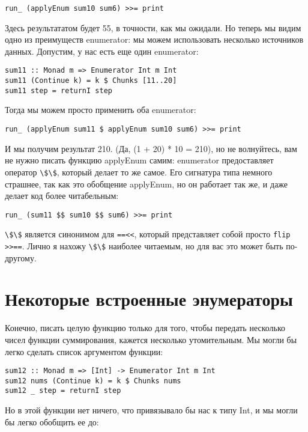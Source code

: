 \begin{lstlisting}
run_ (applyEnum sum10 sum6) >>= print
\end{lstlisting}

Здесь результататом будет 55, в точности, как мы ожидали. Но теперь мы видим одно из преимуществ enumerator: мы можем использовать несколько источников данных. Допустим, у нас есть еще один enumerator:

\begin{lstlisting}
sum11 :: Monad m => Enumerator Int m Int
sum11 (Continue k) = k $ Chunks [11..20]
sum11 step = returnI step
\end{lstlisting}%

Тогда мы можем просто применить оба enumerator:

\begin{lstlisting}
run_ (applyEnum sum11 $ applyEnum sum10 sum6) >>= print
\end{lstlisting}%

И мы получим результат 210. (Да, (1 + 20) * 10 = 210), но не волнуйтесь, вам не нужно писать функцию applyEnum самим: enumerator предоставляет оператор \lstinline'\$\$', который делает то же самое. Его сигнатура типа немного страшнее, так как это обобщение applyEnum, но он работает так же, и даже делает код более читабельным:

\begin{lstlisting}
run_ (sum11 $$ sum10 $$ sum6) >>= print
\end{lstlisting}%

\lstinline'\$\$' является синонимом для \lstinline'==<<', который представляет собой просто \lstinline'flip >>=='. Лично я нахожу \lstinline'\$\$' наиболее читаемым, но для вас это может быть по-другому.

\section{Некоторые встроенные энумераторы}

Конечно, писать целую функцию только для того, чтобы передать несколько чисел функции суммирования, кажется несколько утомительным. Мы могли бы легко сделать список аргументом функции:

\begin{lstlisting}
sum12 :: Monad m => [Int] -> Enumerator Int m Int
sum12 nums (Continue k) = k $ Chunks nums
sum12 _ step = returnI step
\end{lstlisting}%

Но в этой функции нет ничего, что привязывало бы нас к типу Int, и мы могли бы легко обобщить ее до:

